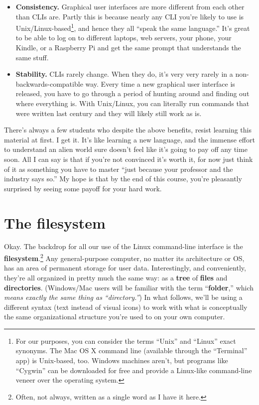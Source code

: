 \begin{itemize}
\item \textbf{Consistency.} Graphical user interfaces are more different from
each other than CLIs are. Partly this is because nearly any CLI you're likely
to use is Unix/Linux-based\footnote{For our purposes, you can consider the
terms ``Unix'' and ``Linux'' exact synonyms. The Mac OS X command line
(available through the ``Terminal'' app) is Unix-based, too. Windows machines
aren't, but programs like ``Cygwin'' can be downloaded for free and provide a
Linux-like command-line veneer over the operating system.}, and hence they all
``speak the same language.'' It's great to be able to log on to different
laptops, web servers, your phone, your Kindle, or a Raspberry Pi and get the
same prompt that understands the same stuff.

\item \textbf{Stability.} CLIs rarely change. When they do, it's very very
rarely in a non-backwards-compatible way. Every time a new graphical user
interface is released, you have to go through a period of hunting around and
finding out where everything is. With Unix/Linux, you can literally run
commands that were written last century and they will likely still work as is.

\end{itemize}

There's always a few students who despite the above benefits, resist learning
this material at first. I get it. It's like learning a new language, and the
immense effort to understand an alien world sure doesn't feel like it's going
to pay off any time soon. All I can say is that if you're not convinced it's
worth it, for now just think of it as something you have to master ``just
because your professor and the industry says so.'' My hope is that by the end
of this course, you're pleasantly surprised by seeing some payoff for your
hard work.


\section{The filesystem}

Okay. The backdrop for all our use of the Linux command-line interface is the
\textbf{filesystem}.\footnote{Often, not always, written as a single word as I
have it here.} Any general-purpose computer, no matter its architecture or OS,
has an area of permanent storage for user data. Interestingly, and
conveniently, they're all organized in pretty much the same way: as a
\textbf{tree} of \textbf{files} and \textbf{directories}. (Windows/Mac users
will be familiar with the term ``\textbf{folder},'' which \textit{means exactly
the same thing as ``directory.''}) In what follows, we'll be using a different
syntax (text instead of visual icons) to work with what is conceptually the
same organizational structure you're used to on your own computer.

